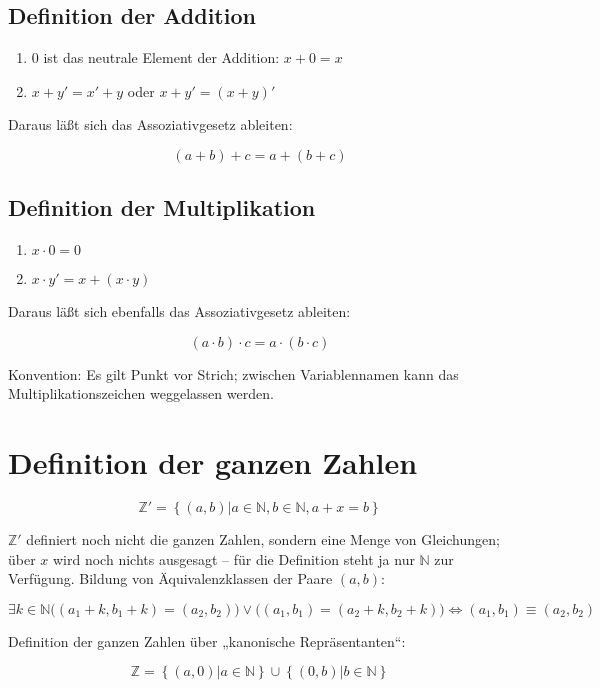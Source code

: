 \subsection{Definition der Addition}

\begin{enumerate}
  \item $0$ ist das neutrale Element der Addition: $x+0=x$
  \item $x+y'=x'+y$ oder $x+y' = (x+y)'$
\end{enumerate}

Daraus läßt sich das Assoziativgesetz ableiten:

$$(a+b)+c = a+(b+c)$$


\subsection{Definition der Multiplikation}

\begin{enumerate}
  \item $x \cdot 0=0$
  \item $x \cdot y'=x+(x \cdot y)$
\end{enumerate}

Daraus läßt sich ebenfalls das Assoziativgesetz ableiten:

$$(a \cdot b) \cdot c = a \cdot (b \cdot c)$$

Konvention: Es gilt Punkt vor Strich; zwischen Variablennamen kann das Multiplikationszeichen weggelassen werden.


\section{Definition der ganzen Zahlen}

$$\mathbb{Z}' = \left\{ (a,b) | a \in \mathbb{N}, b \in \mathbb{N}, a+x=b \right\}$$

$\mathbb{Z}'$ definiert noch nicht die ganzen Zahlen, sondern eine Menge von Gleichungen; über $x$ wird noch nichts ausgesagt -- für die Definition steht ja nur $\mathbb{N}$ zur Verfügung. Bildung von Äquivalenzklassen der Paare $(a,b)$:

$$ \exists k \in \mathbb{N} \big((a_1+k,b_1+k)=(a_2,b_2)\big) \vee \big((a_1,b_1)=(a_2+k,b_2+k)\big) \iff (a_1,b_1) \equiv (a_2,b_2) $$

Definition der ganzen Zahlen über „kanonische Repräsentanten“:

$$\mathbb{Z} = \left\{ (a,0) | a \in \mathbb{N} \right\} \cup \left\{ (0,b) | b \in \mathbb{N} \right\} $$

